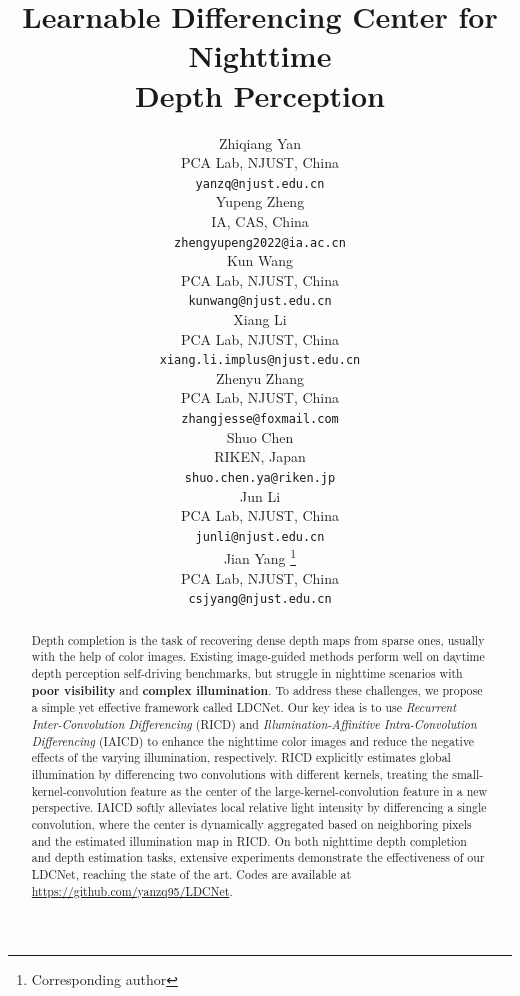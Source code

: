 \documentclass{article}
\title{Learnable Differencing Center for Nighttime \\ Depth Perception}
\author{
  Zhiqiang Yan \\
  PCA Lab, NJUST, China \\
  \texttt{yanzq@njust.edu.cn} \\
  \And
  Yupeng Zheng \\
  IA, CAS, China \\
  \texttt{zhengyupeng2022@ia.ac.cn} \\
  \And
  Kun Wang  \\
  PCA Lab, NJUST, China \\
  \texttt{kunwang@njust.edu.cn} \\
 \And
  Xiang Li  \\
  PCA Lab, NJUST, China \\
  \texttt{xiang.li.implus@njust.edu.cn} \\
  \And
  Zhenyu Zhang  \\
  PCA Lab, NJUST, China \\
  \texttt{zhangjesse@foxmail.com} \\
  \And
  Shuo Chen  \\
  RIKEN, Japan \\
  \texttt{shuo.chen.ya@riken.jp} \\
  \And
  Jun Li \\
  PCA Lab, NJUST, China \\
  \texttt{junli@njust.edu.cn} \\
  \And
  Jian Yang \thanks{Corresponding author} \\
  PCA Lab, NJUST, China \\
  \texttt{csjyang@njust.edu.cn} \\
}
\begin{document}
\maketitle


\begin{abstract}
Depth completion is the task of recovering dense depth maps from sparse ones, usually with the help of color images. Existing image-guided methods perform well on daytime depth perception self-driving benchmarks, but struggle in nighttime scenarios with \textbf{poor visibility} and \textbf{complex illumination}. To address these challenges, we propose a simple yet effective framework called LDCNet. Our key idea is to use \emph{Recurrent Inter-Convolution Differencing} (RICD) and \emph{Illumination-Affinitive Intra-Convolution Differencing} (IAICD) to enhance the nighttime color images and reduce the negative effects of the varying illumination, respectively. RICD explicitly estimates global illumination by differencing two convolutions with different kernels, treating the small-kernel-convolution feature as the center of the large-kernel-convolution feature in a new perspective. IAICD softly alleviates local relative light intensity by differencing a single convolution, where the center is dynamically aggregated based on neighboring pixels and the estimated illumination map in RICD. On both nighttime depth completion and depth estimation tasks, extensive experiments demonstrate the effectiveness of our LDCNet, reaching the state of the art. Codes are available at \url{https://github.com/yanzq95/LDCNet}. 
\end{abstract}


\end{document}
